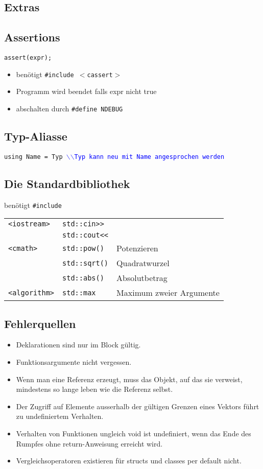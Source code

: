 \documentclass[a3paper, 10pt, landscape]{scrartcl}
\newcommand{\code}[1]{\texttt{#1}}
\begin{document}
\begin{multicols*}{3}

\section{Extras}

	\subsection{Assertions}
	\code{assert(expr);}
	\begin{itemize}
		\item benötigt \code{\#include $<$cassert$>$}
		\item Programm wird beendet falls expr nicht true
		\item abschalten durch \code{\#define NDEBUG}
	\end{itemize}
	
	\subsection{Typ-Aliasse}
	\code{using Name = Typ \textcolor{blue}{$\backslash$$\backslash$Typ kann neu mit Name angesprochen werden}
	}
	\subsection{Die Standardbibliothek}
	benötigt \code{\#include} \\
	\begin{tabular}{l l l}
	\code{<iostream>} & \code{std::cin>>} \\
	& \code{std::cout<<} \\
	\hline
	\code{<cmath>} & \code{std::pow()} & Potenzieren \\
	& \code{std::sqrt()} & Quadratwurzel \\
	& \code{std::abs()} & Absolutbetrag \\
	\hline
	\code{<algorithm>} & \code{std::max} & Maximum zweier Argumente
	\end{tabular}
	
	
	\subsection{Fehlerquellen}
	\vspace{0.1cm}
	\begin{itemize}
		\item Deklarationen sind nur im Block gültig.
		\item Funktionsargumente nicht vergessen.
		\item Wenn man eine Referenz erzeugt, muss das Objekt, auf das sie verweist, mindestens so lange leben wie die Referenz selbst.
		\item Der Zugriff auf Elemente ausserhalb der gültigen Grenzen eines Vektors führt zu undefiniertem Verhalten.
		\item Verhalten von Funktionen ungleich void ist undefiniert, wenn das Ende des Rumpfes ohne return-Anweisung erreicht wird.
		\item Vergleichsoperatoren existieren für structs und classes per default nicht.
	\end{itemize}
	
	


												
    \end{multicols*}
\setcounter{secnumdepth}{2}
\end{document}
